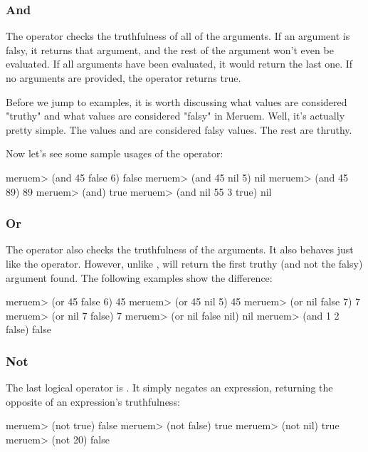 \subsubsection{And}
The  operator checks the truthfulness of all of the arguments. If an argument is falsy, it returns that argument, and the rest of the argument won't even be evaluated. If all arguments have been evaluated, it would return the last one. If no arguments are provided, the  operator returns true.

Before we jump to examples, it is worth discussing what values are considered "truthy" and what values are considered "falsy" in Meruem. Well, it's actually pretty simple. The values  and  are considered falsy values. The rest are thruthy.

Now let's see some sample usages of the  operator:

\begin{REPL}
meruem> (and 45 false 6)
false
meruem> (and 45 nil 5)
nil
meruem> (and 45 89)
89
meruem> (and)
true
meruem> (and nil 55 3 true)
nil
\end{REPL}

\subsubsection{Or}
The  operator also checks the truthfulness of the arguments. It also behaves just like the  operator. However, unlike ,  will return the first truthy (and not the falsy) argument found. The following examples show the difference:

\begin{REPL}
meruem> (or 45 false 6)
45
meruem> (or 45 nil 5)
45
meruem> (or nil false 7)
7
meruem> (or nil 7 false)
7
meruem> (or nil false nil)  
nil
meruem> (and 1 2 false)
false
\end{REPL}

\subsubsection{Not}
The last logical operator is . It simply negates an expression, returning the opposite of an expression's truthfulness:

\begin{REPL}
meruem> (not true)
false
meruem> (not false)
true
meruem> (not nil)
true
meruem> (not 20)
false
\end{REPL}


